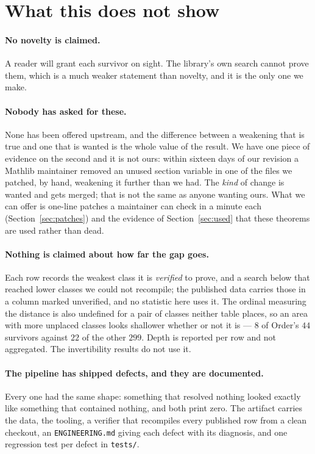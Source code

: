 \documentclass[11pt]{article}
\begin{document}
\section{What this does not show}\label{sec:limits}

\paragraph{No novelty is claimed.} A reader will grant each survivor on sight.
The library's own search cannot prove them, which is a much weaker statement
than novelty, and it is the only one we make.

\paragraph{Nobody has asked for these.} None has been offered upstream, and the
difference between a weakening that is true and one that is wanted is the whole
value of the result. We have one piece of evidence on the second and it is not
ours: within sixteen days of our revision a Mathlib maintainer removed an unused
section variable in one of the files we patched, by hand, weakening it further
than we had. The \emph{kind} of change is wanted and gets merged; that is not
the same as anyone wanting ours. What we can offer is \patchKept{} one-line
patches a maintainer can check in a minute each (Section~\ref{sec:patches}) and
the evidence of Section~\ref{sec:used} that these theorems are used rather than
dead.

\paragraph{Nothing is claimed about how far the gap goes.} Each row records the
weakest class it is \emph{verified} to prove, and a search below that reached
lower classes we could not recompile; the published data carries those in a
column marked unverified, and no statistic here uses it. The ordinal measuring
the distance is also undefined for a pair of classes neither table places, so an
area with more unplaced classes looks shallower whether or not it is --- $8$ of
Order's $44$ survivors against $22$ of the other $299$. Depth is reported per
row and not aggregated. The invertibility results do not use it.

\paragraph{The pipeline has shipped defects, and they are documented.} Every one
had the same shape: something that resolved nothing looked exactly like
something that contained nothing, and both print zero. The artifact
\cite{artifact} carries the data, the tooling, a verifier that recompiles every
published row from a clean checkout, an \texttt{ENGINEERING.md} giving each
defect with its diagnosis, and one regression test per defect in
\texttt{tests/}.
\end{document}
